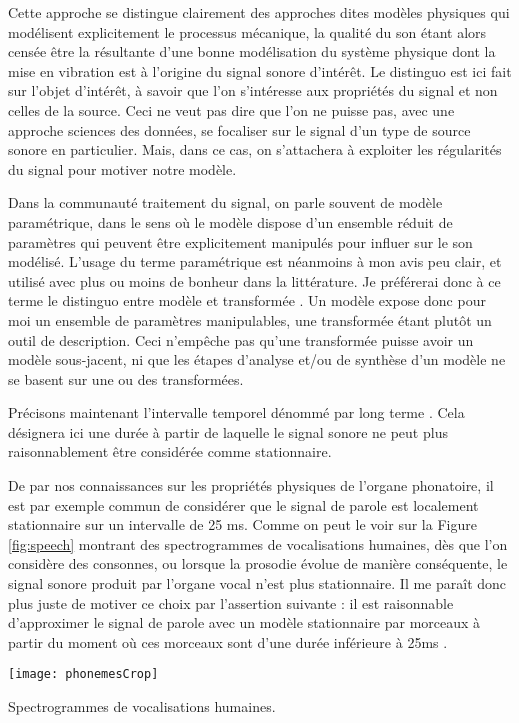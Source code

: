 Cette approche se distingue clairement des approches dites \og modèles physiques \fg qui modélisent explicitement le processus mécanique, la qualité du son étant alors censée être la résultante d'une bonne modélisation du système physique dont la mise en vibration est à l'origine du signal sonore d'intérêt. Le distinguo est ici fait sur l'objet d'intérêt, à savoir que l'on s'intéresse aux propriétés du signal et non celles de la source. Ceci ne veut pas dire que l'on ne puisse pas, avec une approche sciences des données, se focaliser sur le signal d'un type de source sonore en particulier. Mais, dans ce cas, on s'attachera à exploiter les régularités du signal pour motiver notre modèle.

Dans la communauté traitement du signal, on parle souvent de modèle paramétrique, dans le sens où le modèle dispose d'un ensemble réduit de paramètres qui peuvent être explicitement manipulés pour influer sur le son modélisé. L'usage du terme \og paramétrique \fg est néanmoins à mon avis peu clair, et utilisé avec plus ou moins de bonheur dans la littérature. Je préférerai donc à ce terme le distinguo entre \og modèle \fg et \og transformée \fg. Un modèle expose donc pour moi un ensemble de paramètres manipulables, une transformée étant plutôt un outil de description. Ceci n'empêche pas qu'une transformée puisse avoir un modèle sous-jacent, ni que les étapes d'analyse et/ou de synthèse d'un modèle ne se basent sur une ou des transformées.

Précisons maintenant l'intervalle temporel dénommé par \og long terme \fg. Cela désignera ici une durée à partir de laquelle le signal sonore ne peut plus raisonnablement être considérée comme stationnaire.

De par nos connaissances sur les propriétés physiques de l'organe phonatoire, il est par exemple commun de considérer que le signal de parole est localement stationnaire sur un intervalle de 25 ms. Comme on peut le voir sur la Figure \ref{fig:speech} montrant des spectrogrammes de vocalisations humaines\cite{ladefoged2014course}, dès que l'on considère des consonnes, ou lorsque la prosodie évolue de manière conséquente, le signal sonore produit par l'organe vocal n'est plus stationnaire. Il me paraît donc plus juste de motiver ce choix par l'assertion suivante : \og il est raisonnable d'approximer le signal de parole avec un modèle stationnaire par morceaux à partir du moment où ces morceaux sont d'une durée inférieure à 25ms \fg.

\begin{marginfigure}
  \texttt{[image: phonemesCrop]}
  \caption{Spectrogrammes de vocalisations humaines.}
  \label{fig:speech} %
\end{marginfigure}

